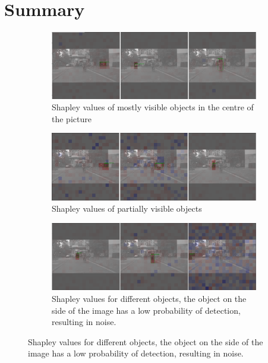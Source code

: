 \newpage
\section{Summary}\label{sec:results}
\begin{figure}[ht!]
    \centering
    \begin{subfigure}[b]{\textwidth}
        \includegraphics[width=\textwidth]{figures/output}
        \caption{Shapley values of mostly visible objects in the centre of the picture}\label{fig:SHAP_results2}
    \end{subfigure}
    \hfill
    \begin{subfigure}[b]{\textwidth}
        \includegraphics[width=\textwidth]{figures/output2}
        \caption{Shapley values of partially visible objects}\label{fig:SHAP_results20}
    \end{subfigure}
    \hfill
    \begin{subfigure}[b]{\textwidth}
        \includegraphics[width=\textwidth]{figures/output2,1}
        \caption{Shapley values for different objects, the object on the side of the image has a low probability of detection, resulting in noise.}\label{fig:SHAP_results21}
    \end{subfigure}

\end{figure}
